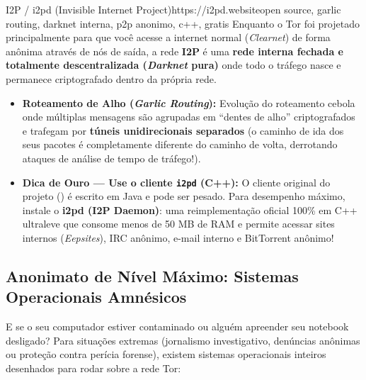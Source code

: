 \documentclass{pousadaguide}
\begin{document}
\begin{ferramenta}[goat,logo=i2p]{I2P / i2pd (Invisible Internet Project)}{https://i2pd.website}{open source, garlic routing, darknet interna, p2p anonimo, c++, gratis}
Enquanto o Tor foi projetado principalmente para que você acesse a internet normal (\emph{Clearnet}) de forma anônima através de nós de saída, a rede \textbf{I2P} é uma \textbf{rede interna fechada e totalmente descentralizada (\emph{Darknet} pura)} onde todo o tráfego nasce e permanece criptografado dentro da própria rede.
\begin{itemize}
  \item \textbf{Roteamento de Alho (\emph{Garlic Routing}):} Evolução do roteamento cebola onde múltiplas mensagens são agrupadas em ``dentes de alho'' criptografados e trafegam por \textbf{túneis unidirecionais separados} (o caminho de ida dos seus pacotes é completamente diferente do caminho de volta, derrotando ataques de análise de tempo de tráfego!).
  \item \textbf{Dica de Ouro — Use o cliente \texttt{i2pd} (C++):} O cliente original do projeto () é escrito em Java e pode ser pesado. Para desempenho máximo, instale o \textbf{i2pd (I2P Daemon)}: uma reimplementação oficial 100\% em C++ ultraleve que consome menos de 50 MB de RAM e permite acessar sites internos  (\emph{Eepsites}), IRC anônimo, e-mail interno e BitTorrent anônimo! 
\end{itemize}
\end{ferramenta}

\clearpage
\subsection{Anonimato de Nível Máximo: Sistemas Operacionais Amnésicos}

E se o seu computador estiver contaminado ou alguém apreender seu notebook desligado? Para situações extremas (jornalismo investigativo, denúncias anônimas ou proteção contra perícia forense), existem sistemas operacionais inteiros desenhados para rodar sobre a rede Tor:
\end{document}
